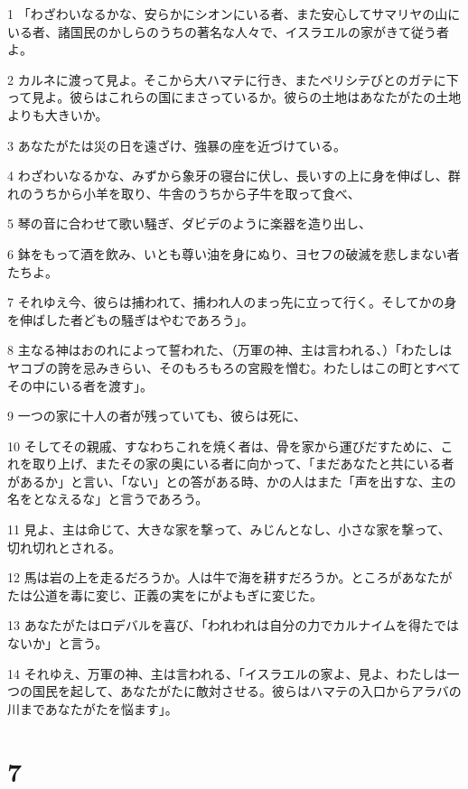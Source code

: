 \par 1 「わざわいなるかな、安らかにシオンにいる者、また安心してサマリヤの山にいる者、諸国民のかしらのうちの著名な人々で、イスラエルの家がきて従う者よ。
\par 2 カルネに渡って見よ。そこから大ハマテに行き、またペリシテびとのガテに下って見よ。彼らはこれらの国にまさっているか。彼らの土地はあなたがたの土地よりも大きいか。
\par 3 あなたがたは災の日を遠ざけ、強暴の座を近づけている。
\par 4 わざわいなるかな、みずから象牙の寝台に伏し、長いすの上に身を伸ばし、群れのうちから小羊を取り、牛舎のうちから子牛を取って食べ、
\par 5 琴の音に合わせて歌い騒ぎ、ダビデのように楽器を造り出し、
\par 6 鉢をもって酒を飲み、いとも尊い油を身にぬり、ヨセフの破滅を悲しまない者たちよ。
\par 7 それゆえ今、彼らは捕われて、捕われ人のまっ先に立って行く。そしてかの身を伸ばした者どもの騒ぎはやむであろう」。
\par 8 主なる神はおのれによって誓われた、（万軍の神、主は言われる、）「わたしはヤコブの誇を忌みきらい、そのもろもろの宮殿を憎む。わたしはこの町とすべてその中にいる者を渡す」。
\par 9 一つの家に十人の者が残っていても、彼らは死に、
\par 10 そしてその親戚、すなわちこれを焼く者は、骨を家から運びだすために、これを取り上げ、またその家の奥にいる者に向かって、「まだあなたと共にいる者があるか」と言い、「ない」との答がある時、かの人はまた「声を出すな、主の名をとなえるな」と言うであろう。
\par 11 見よ、主は命じて、大きな家を撃って、みじんとなし、小さな家を撃って、切れ切れとされる。
\par 12 馬は岩の上を走るだろうか。人は牛で海を耕すだろうか。ところがあなたがたは公道を毒に変じ、正義の実をにがよもぎに変じた。
\par 13 あなたがたはロデバルを喜び、「われわれは自分の力でカルナイムを得たではないか」と言う。
\par 14 それゆえ、万軍の神、主は言われる、「イスラエルの家よ、見よ、わたしは一つの国民を起して、あなたがたに敵対させる。彼らはハマテの入口からアラバの川まであなたがたを悩ます」。

\chapter{7}

